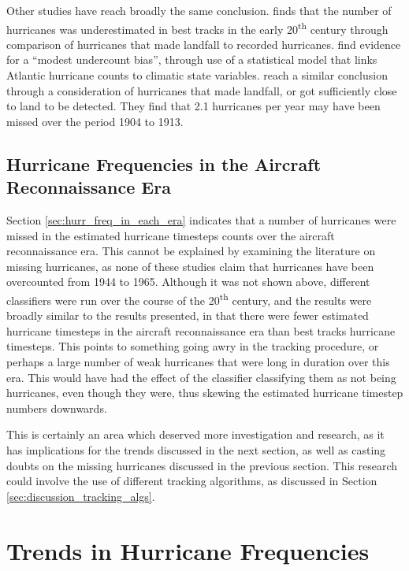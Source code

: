 \documentclass[pdftex,12pt,a4paper]{report}
\newcommand{\ts}{\textsuperscript}
\begin{document}
Other studies have reach broadly the same conclusion. \textcite{landsea2007counting} finds that the
number of hurricanes was underestimated in best tracks in the early 20\ts{th} century through
comparison of hurricanes that made landfall to recorded hurricanes. \textcite{mann2007evidence} find
evidence for a ``modest undercount bias'', through use of a statistical model that links Atlantic
hurricane counts to climatic state variables. \textcite{chang2007number} reach a similar conclusion
through a consideration of hurricanes that made landfall, or got sufficiently close to land to be
detected. They find that 2.1 hurricanes per year may have been missed over the period 1904 to 1913.

\subsection{Hurricane Frequencies in the Aircraft Reconnaissance Era}
Section \ref{sec:hurr_freq_in_each_era} indicates that a number of hurricanes were missed in the
estimated hurricane timesteps counts over the aircraft reconnaissance era. This cannot be explained
by examining the literature on missing hurricanes, as none of these studies claim that hurricanes
have been overcounted from 1944 to 1965. Although it was not shown above, different classifiers were
run over the course of the 20\ts{th} century, and the results were broadly similar to the results
presented, in that there were fewer estimated hurricane timesteps in the aircraft reconnaissance era
than best tracks hurricane timesteps. This points to something going awry in the tracking procedure,
or perhaps a large number of weak hurricanes that were long in duration over this era. This would
have had the effect of the classifier classifying them as not being hurricanes, even though they
were, thus skewing the estimated hurricane timestep numbers downwards. 

This is certainly an area which deserved more investigation and research, as it has implications
for the trends discussed in the next section, as well as casting doubts on the missing hurricanes
discussed in the previous section. This research could involve the use of different tracking
algorithms, as discussed in Section \ref{sec:discussion_tracking_algs}.

\section{Trends in Hurricane Frequencies}
\end{document}
